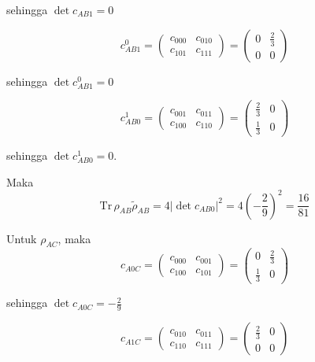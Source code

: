 sehingga $\det c_{AB1} = 0$

\begin{equation}
	c_{AB1}^0=
	\begin{pmatrix}
		c_{000} & c_{010} \\
		c_{101} & c_{111}
	\end{pmatrix}=
	\begin{pmatrix}
		0 & \frac{2}{3} \\
		0 & 0
	\end{pmatrix}
\end{equation}

sehingga $\det c_{AB1}^0 = 0$

\begin{equation}
	c_{AB0}^1=
	\begin{pmatrix}
		c_{001} & c_{011} \\
		c_{100} & c_{110}
	\end{pmatrix}=
	\begin{pmatrix}
		\frac{2}{3} & 0 \\
		\frac{1}{3} & 0
	\end{pmatrix}
\end{equation}

sehingga $\det c_{AB0}^1 = 0$.

Maka
\begin{equation}
	\mathrm{Tr}\,\rho_{AB}\tilde{\rho}_{AB}=4|\det c_{AB0}|^2=4(-\frac{2}{9})^2=\frac{16}{81}
\end{equation}

Untuk $\rho_{AC}$, maka
\begin{equation}
	c_{A0C}=
	\begin{pmatrix}
		c_{000} & c_{001} \\
		c_{100} & c_{101}
	\end{pmatrix}=
	\begin{pmatrix}
		0 & \frac{2}{3} \\
		\frac{1}{3} & 0
	\end{pmatrix}
\end{equation}

sehingga $\det c_{A0C} = -\frac{2}{9}$

\begin{equation}
	c_{A1C}=
	\begin{pmatrix}
		c_{010} & c_{011} \\
		c_{110} & c_{111}
	\end{pmatrix}=
	\begin{pmatrix}
		\frac{2}{3} & 0 \\
		0 & 0
	\end{pmatrix}
\end{equation}


